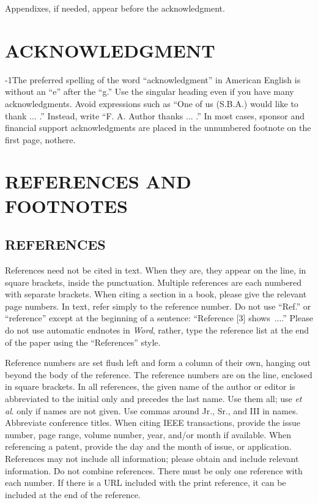 \documentclass{IEEEjmw}
\begin{document}
Appendixes, if needed, appear before the acknowledgment.

\section*{ACKNOWLEDGMENT}

\looseness-1The preferred spelling of the word ``acknowledgment'' in American English is without an ``e'' after the ``g.'' Use the singular heading even if you have many acknowledgments. Avoid expressions such as ``One of us (S.B.A.) would like to thank ... .'' Instead, write ``F. A. Author thanks ... .'' In most cases, sponsor and financial support acknowledgments are placed in the unnumbered footnote on the first page, not\break here.

\section*{REFERENCES AND FOOTNOTES}

\subsection{REFERENCES}

References need not be cited in text. When they are, they appear on the line, in square brackets, inside the punctuation. Multiple references are each numbered with separate brackets. When citing a section in a book, please give the relevant page numbers. In text, refer simply to the reference number. Do not use ``Ref.'' or ``reference'' except at the beginning of a sentence: ``Reference [3] shows~....'' Please do not use automatic endnotes in {\it Word}, rather, type the reference list at the end of the paper using the ``References''  style.

Reference numbers are set flush left and form a column of their own, hanging out beyond the body of the reference. The reference numbers are on the line, enclosed in square brackets. In all references, the given name of the author or editor is abbreviated to the initial only and precedes the last name. Use them all; use {\it et al}. only if names are not given. Use commas around Jr., Sr., and III in names. Abbreviate conference titles. When citing IEEE transactions, provide the issue number, page range, volume number, year, and/or month if available. When referencing a patent, provide the day and the month of issue, or application. References may not include all information; please obtain and include relevant information. Do not combine references. There must be only one reference with each number. If there is a URL included with the print reference, it can be included at the end of the reference. 
\end{document}
